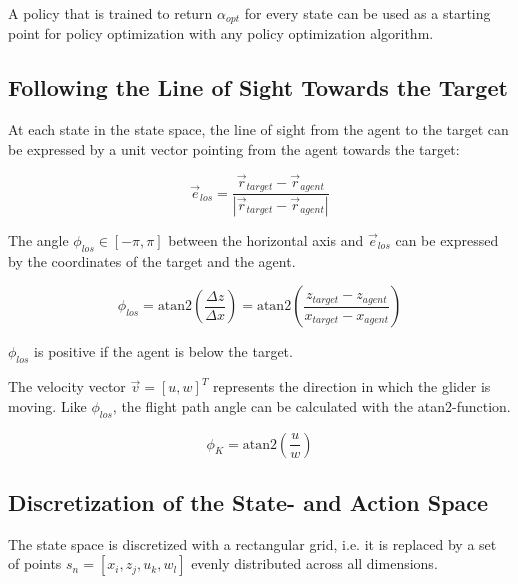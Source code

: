 A policy that is trained to return $\alpha_{opt}$ for every state can be used as a starting point for policy optimization with any policy optimization algorithm.

\subsection{Following the Line of Sight Towards the Target}

At each state in the state space, the line of sight from the agent to the target can be expressed by a unit vector pointing from the agent towards the target:

\begin{equation}
\vec{e}_{los} = \frac{\vec{r}_{target}-\vec{r}_{agent}}{|\vec{r}_{target}-\vec{r}_{agent}|}
\end{equation}

The angle $\phi_{los}\in [-\pi,\pi]$ between the horizontal axis and $\vec{e}_{los}$ can be expressed by the coordinates of the target and the agent.

\begin{equation}
\phi_{los}=\text{atan2} \left( \frac{\Delta z}{\Delta x} \right) =\text{atan2}\left(\frac{z_{target}-z_{agent}}{x_{target}-x_{agent}}\right)
\end{equation}

$\phi_{los}$ is positive if the agent is below the target.

The velocity vector $\vec{v}=[u,w]^T$ represents the direction in which the glider is moving. Like $\phi_{los}$, the flight path angle can be calculated with the atan2-function.

\begin{equation}
\phi_K = \text{atan2}\left(\frac{u}{w}\right)
\end{equation}

\subsection{Discretization of the State- and Action Space}

The state space is discretized with a rectangular grid, i.e. it is replaced by a set of points $s_n=[x_i,z_j,u_k,w_l]$ evenly distributed across all dimensions.

